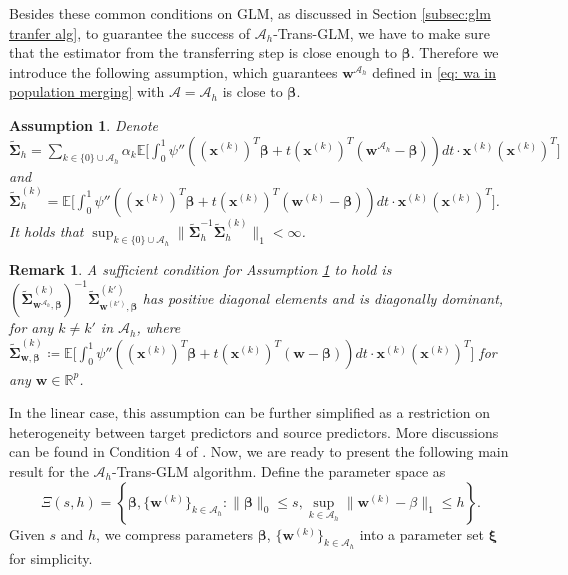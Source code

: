 \documentclass[12pt]{article}
\newcommand{\te}{\mathbb{E}}
\newcommand{\bxi}{\bm{\xi}}
\newcommand{\onenorm}[1]{\|#1\|_{1}}
\newcommand{\zeronorm}[1]{\|#1\|_{0}}
\newcommand{\bbeta}{\bm{\beta}}
\newcommand{\bxk}[1]{\bm{x}^{(#1)}}
\newcommand{\bw}{\bm{w}}
\newcommand{\bwk}[1]{\bm{w}^{(#1)}}
\newcommand{\bwah}{\bm{w}^{\mathcal{A}_h}}
\newcommand{\ma}{\mathcal{A}}
\newcommand{\mah}{\mathcal{A}_h}
\newcommand{\transet}{\{0\}\cup \mah}
\newcommand{\<}{\langle}
\renewcommand{\>}{\rangle}
\newcommand{\bSigma}{\bm{\Sigma}}
\newtheorem{remark}{Remark}
\newtheorem{assumption}{Assumption}
\begin{document}
Besides these common conditions on GLM, as discussed in Section \ref{subsec:glm tranfer alg}, to guarantee the success of $\mah$-Trans-GLM, we have to make sure that the estimator from the transferring step is close enough to $\bbeta$. Therefore we introduce the following assumption, which guarantees $\bwah$ defined in \eqref{eq: wa in population merging} with $\ma = \mah$ is close to $\bbeta$. 

\begin{assumption}\label{asmp: merging}
Denote $\widetilde{\bm{\Sigma}}_h = \sum_{k \in \transet} \alpha_k \te\Big[\int_0^1 \psi''((\bxk{k})^T\bbeta+t(\bxk{k})^T(\bwah-\bbeta))dt \cdot \bxk{k}(\bxk{k})^T \Big]$ and $\widetilde{\bm{\Sigma}}_h^{(k)} = \te\Big[\int_0^1 \psi''((\bxk{k})^T\bbeta+t(\bxk{k})^T(\bwk{k}-\bbeta))dt \cdot \bxk{k}(\bxk{k})^T \Big]$. It holds that $\sup_{k \in \transet}\onenorm{\widetilde{\bm{\Sigma}}_h^{-1}\widetilde{\bm{\Sigma}}_h^{(k)}} < \infty$.
\end{assumption}
\begin{remark}
	A sufficient condition for Assumption \ref{asmp: merging} to hold is $(\widetilde{\bSigma}^{(k)}_{\bwah, \bbeta})^{-1}\widetilde{\bSigma}^{(k')}_{\bwk{k'}, \bbeta}$ has positive diagonal elements and is diagonally dominant, for any $k \neq k'$ in $\mah$, where $\widetilde{\bSigma}^{(k)}_{\bw, \bbeta} \coloneqq \te\Big[\int_0^1 \psi''((\bxk{k})^T\bbeta+t(\bxk{k})^T(\bw-\bbeta))dt \cdot \bxk{k}(\bxk{k})^T \Big]$ for any $\bw \in \mathbb{R}^p$.
\end{remark}
In the linear case, this assumption can be further simplified as a restriction on heterogeneity between target predictors and source predictors. More discussions can be found in Condition 4 of \cite{li2021transfer}. Now, we are ready to present the following main result for the $\mah$-Trans-GLM algorithm. Define the parameter space as
\begin{equation}
	\Xi(s, h) = \left\{\bbeta, \{\bwk{k}\}_{k\in \mah}: \zeronorm{\bbeta} \leq s, \sup_{k\in \mah}\onenorm{\bwk{k} - \beta} \leq h\right\}.
\end{equation}
Given $s$ and $h$, we compress parameters $\bbeta$, $\{\bwk{k}\}_{k\in \mah}$ into a parameter set $\bxi$ for simplicity.
\end{document}
